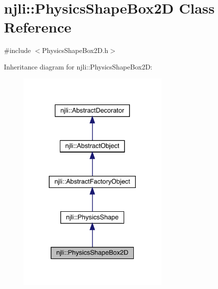 \hypertarget{classnjli_1_1_physics_shape_box2_d}{}\section{njli\+:\+:Physics\+Shape\+Box2D Class Reference}
\label{classnjli_1_1_physics_shape_box2_d}


{\ttfamily \#include $<$Physics\+Shape\+Box2\+D.\+h$>$}



Inheritance diagram for njli\+:\+:Physics\+Shape\+Box2D\+:\nopagebreak
\begin{figure}[H]
\begin{center}
\leavevmode
\includegraphics[width=213pt]{classnjli_1_1_physics_shape_box2_d__inherit__graph}
\end{center}
\end{figure}


